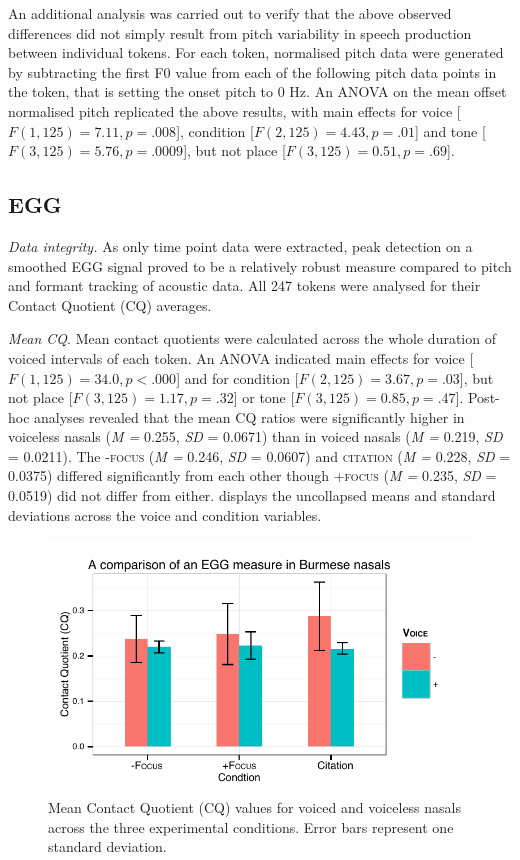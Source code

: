 \documentclass[12pt]{article}
\newcommand{\condc}{\textsc{citation }}
\newcommand{\condf}{\textsc{+focus }}
\newcommand{\condu}{\textsc{-focus }}
\begin{document}
An additional analysis was carried out to verify that the above observed differences did not simply result from pitch variability in speech production between individual tokens. For each token, normalised pitch data were generated by subtracting the first F0 value from each of the following pitch data points in the token, that is setting the onset pitch to 0 Hz. An ANOVA on the mean offset normalised pitch replicated the above results, with main effects for voice [$F(1, 125) = 7.11, p = .008$], condition [$F(2, 125) = 4.43, p = .01$] and tone [$F(3, 125) = 5.76, p = .0009$], but not place [$F(3, 125) = 0.51, p = .69$].

\newpage

\subsection{EGG}

\emph{Data integrity.} As only time point data were extracted, peak detection on a smoothed EGG signal proved to be a relatively robust measure compared to pitch and formant tracking of acoustic data. All 247 tokens were analysed for their Contact Quotient (CQ) averages.

\emph{Mean CQ}. Mean contact quotients were calculated across the whole duration of voiced intervals of each token. An ANOVA indicated main effects for voice [$F(1, 125) = 34.0, p < .000$] and for condition [$F(2, 125) = 3.67, p = .03$], but not place [$F(3, 125) = 1.17, p = .32$] or tone [$F(3, 125) = 0.85, p = .47$]. Post-hoc analyses revealed that the mean CQ ratios were significantly higher in voiceless nasals (\emph{M = } 0.255, \emph{SD} = 0.0671) than in voiced nasals (\emph{M = } 0.219, \emph{SD} = 0.0211). The \condu (\emph{M = } 0.246, \emph{SD} = 0.0607) and \condc (\emph{M = } 0.228, \emph{SD} = 0.0375) differed significantly from each other though \condf (\emph{M = } 0.235, \emph{SD} = 0.0519) did not differ from either.  displays the uncollapsed means and standard deviations across the voice and condition variables.

\begin{figure}[h!]
	\centering
	\includegraphics[scale=1.0]{figures/egg.pdf}
	\caption{Mean Contact Quotient (CQ) values for voiced and voiceless nasals across the three experimental conditions. Error bars represent one standard deviation.}
	\label{fig:egg}
\end{figure}
\end{document}
